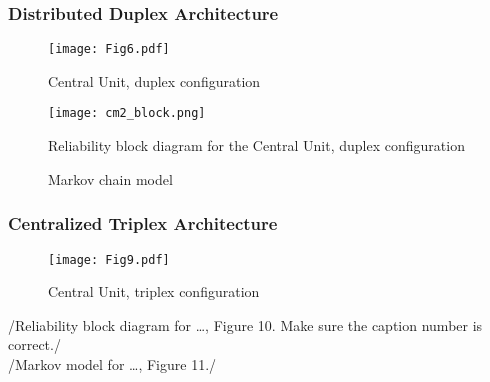 \subsubsection{Distributed Duplex Architecture}
\begin{figure}[H]
  \centering
  \texttt{[image: Fig6.pdf]}
  \caption{Central Unit, duplex configuration }
  \label{fig6}
\end{figure}
\begin{figure}[H]
  \centering
  \texttt{[image: cm2\_block.png]}
  \caption{Reliability block diagram for the Central Unit, duplex configuration}
  \label{fig7}
\end{figure}
\begin{figure}[h!]
\begin{center}
\caption{Markov chain model}
\end{center}
\end{figure}
\subsubsection{Centralized Triplex Architecture}

\begin{figure}[H]
  \centering
  \texttt{[image: Fig9.pdf]}
  \caption{Central Unit, triplex configuration }
  \label{fig9}
\end{figure}
/{Reliability block diagram for …, Figure 10.  Make sure the caption number is correct.}/
\\/{Markov model for …, Figure 11.}/

